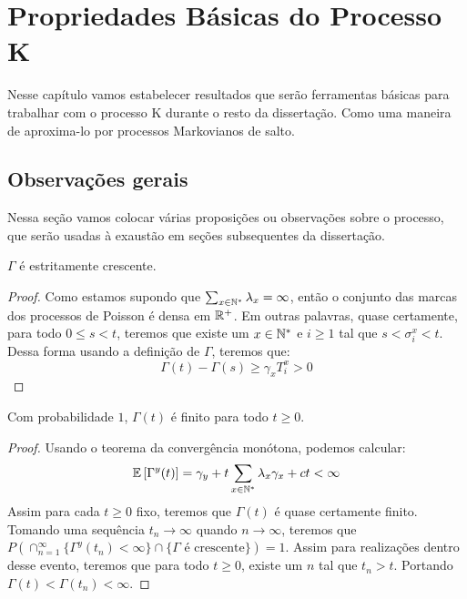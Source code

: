 \chapter{Propriedades Básicas do Processo K}
\label{cap:propriedades}

Nesse capítulo vamos estabelecer resultados que serão ferramentas
básicas para trabalhar com o processo K durante o resto da
dissertação. Como uma maneira de aproxima-lo por processos Markovianos
de salto.


\section{Observações gerais}
\label{sec:observacoes}

Nessa seção vamos colocar várias proposições ou observações sobre o
processo, que serão usadas à exaustão em seções subsequentes da
dissertação.

\begin{proposicao}
  \label{prop:gamma-crescente}
  $\Gamma$ é \qc estritamente crescente.
\end{proposicao}
\begin{proof}
  Como estamos supondo que $\sum_{x \in {\mathbb{N^*}}} \lambda_x = \infty$,
  então o conjunto das marcas dos processos de Poisson é \qc densa em
  ${\mathbb{R}}^+$. Em outras palavras, quase certamente, para todo $0 \leq s <
  t$, teremos que existe um $x \in {\mathbb{N^*}}$ e $i \geq 1$ tal que $s <
  \sigma^x_i < t$. Dessa forma usando a definição de $\Gamma$, teremos
  que:
  \begin{displaymath}
    \Gamma(t) - \Gamma(s) \geq \gamma_x T^x_i > 0
  \end{displaymath}
\end{proof}

\begin{proposicao}
  \label{prop:gamma-finita}
  Com probabilidade $1$, $\Gamma(t)$ é finito para todo $t \geq 0$.
\end{proposicao}
\begin{proof}
  Usando o teorema da convergência monótona, podemos calcular:
  \begin{displaymath}
    {\mathbb{E}} \left[\Gamma^y(t) \right] = \gamma_y + t \sum_{x \in {\mathbb{N^*}}}
    \lambda_x \gamma_x + ct < \infty
  \end{displaymath}
  Assim para cada $t \geq 0$ fixo, teremos que $\Gamma(t)$ é quase
  certamente finito. Tomando uma sequência $t_n \to \infty$ quando $n
  \to \infty$, teremos que $P(\cap_{n = 1}^{\infty} \{ \Gamma^y (t_n)
  < \infty \} \cap \{ \Gamma \textrm{ é crescente}\}) = 1$. Assim para
  realizações dentro desse evento, teremos que para todo $t \geq 0$,
  existe um $n$ tal que $t_n > t$. Portando $\Gamma(t) < \Gamma(t_n) <
  \infty$.
\end{proof}


